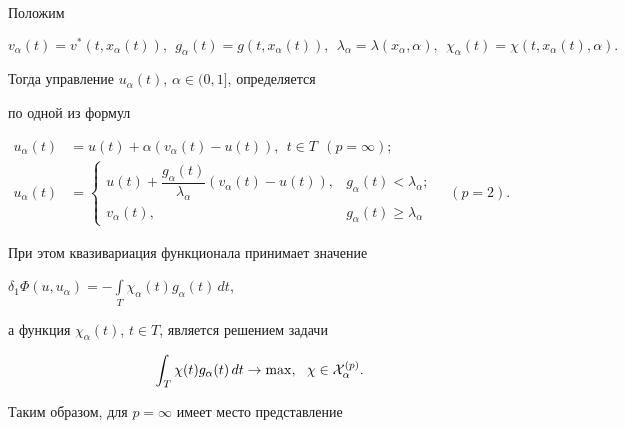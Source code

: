 Положим


$$


v_{\alpha}(t) = v^{*}(t, x_{\alpha}(t)),


\ \ g_{\alpha}(t) = g(t, x_{\alpha}(t)), 


\ \ \lambda_{\alpha} = \lambda(x_{\alpha}, \alpha),


\ \ \chi_{\alpha}(t) = \chi(t, x_{\alpha}(t), \alpha).


$$


Тогда управление $u_{\alpha}(t)$, $\alpha \in (0, 1]$, определяется


по одной из формул


\begin{align}


u_{\alpha}(t) &= u(t) + \alpha(v_{\alpha}(t) - u(t)),


\ \ t \in T\ \ (p = \infty);\\


%


u_{\alpha}(t) &=


\begin{cases}


u(t) + \dfrac{g_{\alpha}(t)}{\lambda_{\alpha}}(v_{\alpha}(t) - u(t)), &


g_{\alpha}(t) < \lambda_{\alpha}; \\[3mm]


v_{\alpha}(t), & g_{\alpha}(t) \geq \lambda_{\alpha} 


\end{cases}


\quad (p = 2).


\end{align}


При этом квазивариация функционала принимает значение


$\delta_{1} \Phi(u, u_{\alpha}) =


- \int\limits_{T} \chi_{\alpha}(t)g_{\alpha}(t)\,dt$,


а функция $\chi_{\alpha}(t)$, $t \in T$, является решением задачи


\begin{equation}


\int_{T} \chi(t)g_{\alpha}(t)\,dt \rightarrow \max,


\ \ \chi \in {\cal X}_{\alpha}^{(p)}.


\end{equation}


Таким образом, для $p = \infty$ имеет место представление


$$


